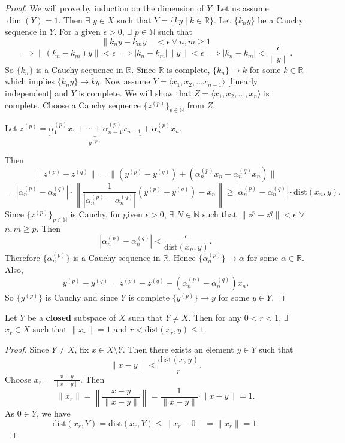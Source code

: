 \documentclass{functionspaces}
\begin{document}
\begin{proof}
We will prove by induction on the dimension of $Y$. Let us assume $\dim(Y)=1$. Then $\exists$ $y \in X$ such that $Y=\{ky \mid k \in \mathbb{R}\}$. Let $\{k_{n}y\}$ be a Cauchy sequence in $Y$. For a given $\epsilon>0$, $\exists$ $p \in \mathbb{N}$ such that
\[
\|k_{n}y-k_{m}y\|<\epsilon\ \forall\ n,m \geq 1
\]
\[
\implies \|(k_{n}-k_{m})y\|<\epsilon\ \implies |k_{n}-k_{m}|\|y\|<\epsilon\ \implies |k_{n}-k_{m}|<\frac{\epsilon}{\|y\|}.
\]
So $\{k_{n}\}$ is a Cauchy sequence in $\mathbb{R}$. Since $\mathbb{R}$ is complete, $\{k_{n}\}\to k$ for some $k \in \mathbb{R}$ which implies $\{k_{n}y\}\to ky$. Now assume $Y=\langle x_{1},x_{2},\ldots x_{n-1}\rangle$ [linearly independent] and $Y$ is complete. We will show that $Z=\langle x_{1},x_{2},\ldots,x_{n}\rangle$ is complete. Choose a Cauchy sequence $\{z^{(p)}\}_{p\in \mathbb{N}}$ from $Z$.

Let $z^{(p)}=\underbrace{\alpha_{1}^{(p)}x_{1}+\cdots+\alpha_{n-1}^{(p)}x_{n-1}}_{y^{(p)}}+\alpha_{n}^{(p)}x_{n}$.

Then
\[
\|z^{(p)}-z^{(q)}\|=\|(y^{(p)}-y^{(q)})+(\alpha_{n}^{(p)}x_{n}-\alpha_{n}^{(q)}x_{n})\|
\]
\[
=|\alpha_{n}^{(p)}-\alpha_{n}^{(q)}|\cdot\left\|\frac{1}{|\alpha_{n}^{(p)}-\alpha_{n}^{(q)}|}(y^{(p)}-y^{(q)})-x_{n}\right\|\geq |\alpha_{n}^{(p)}-\alpha_{n}^{(q)}|\cdot \text{dist}(x_{n},y).
\]
Since $\{z^{(p)}\}_{p\in \mathbb{N}}$ is Cauchy, for given $\epsilon>0$, $\exists$ $N \in \mathbb{N}$ such that $\|z^{p}-z^{q}\|<\epsilon$ $\forall$ $n,m \geq p$. Then
\[
|\alpha_{n}^{(p)}-\alpha_{n}^{(q)}|<\frac{\epsilon}{\text{dist}(x_{n},y)}.
\]
Therefore $\{\alpha_{n}^{(p)}\}$ is a Cauchy sequence in $\mathbb{R}$. Hence $\{\alpha_{n}^{(p)}\}\to \alpha$ for some $\alpha \in \mathbb{R}$. Also,
\[
y^{(p)}-y^{(q)}=z^{(p)}-z^{(q)}-(\alpha_{n}^{(p)}-\alpha_{n}^{(q)})x_{n}.
\]
So $\{y^{(p)}\}$ is Cauchy and since $Y$ is complete $\{y^{(p)}\}\to y$ for some $y \in Y$.
\end{proof}

\begin{lemma}
Let $Y$ be a \textbf{closed} subspace of $X$ such that $Y \neq X$. Then for any $0<r<1$, $\exists$ $x_{r} \in X$ such that $\|x_{r}\|=1$ and $r<\text{dist}(x_{r},y)\leq 1$.
\end{lemma}

\begin{proof}
Since $Y \neq X$, fix $x \in X \setminus Y$. Then there exists an element $y \in Y$ such that
\[
\|x-y\|<\frac{\text{dist}(x,y)}{r}.
\]
Choose $x_{r}=\frac{x-y}{\|x-y\|}$. Then
\[
\|x_{r}\|=\left\|\frac{x-y}{\|x-y\|}\right\|=\frac{1}{\|x-y\|}\cdot\|x-y\|=1.
\]
As $0 \in Y$, we have
\[
\text{dist}(x_{r},Y)=\text{dist}(x_{r},Y)\leq \|x_{r}-0\|=\|x_{r}\|=1.
\]
\end{proof}
\end{document}
